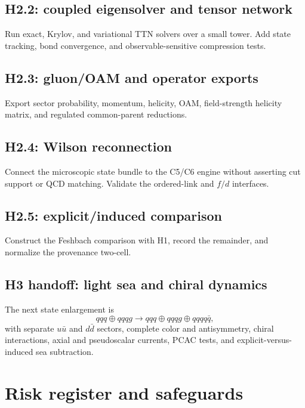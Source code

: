 \documentclass[11pt]{article}
\begin{document}
\subsection{H2.2: coupled eigensolver and tensor network}

Run exact, Krylov, and variational TTN solvers over a small tower.  Add state
tracking, bond convergence, and observable-sensitive compression tests.

\subsection{H2.3: gluon/OAM and operator exports}

Export sector probability, momentum, helicity, OAM, field-strength helicity
matrix, and regulated common-parent reductions.

\subsection{H2.4: Wilson reconnection}

Connect the microscopic state bundle to the C5/C6 engine without asserting cut
support or QCD matching.  Validate the ordered-link and \(f/d\) interfaces.

\subsection{H2.5: explicit/induced comparison}

Construct the Feshbach comparison with H1, record the remainder, and normalize
the provenance two-cell.

\subsection{H3 handoff: light sea and chiral dynamics}

The next state enlargement is
\begin{equation}
 qqq\oplus qqqg
 \longrightarrow
 qqq\oplus qqqg\oplus qqqq\bar q,
\end{equation}
with separate \(u\bar u\) and \(d\bar d\) sectors, complete color and
antisymmetry, chiral interactions, axial and pseudoscalar currents, PCAC tests,
and explicit-versus-induced sea subtraction.

\section{Risk register and safeguards}
\end{document}
